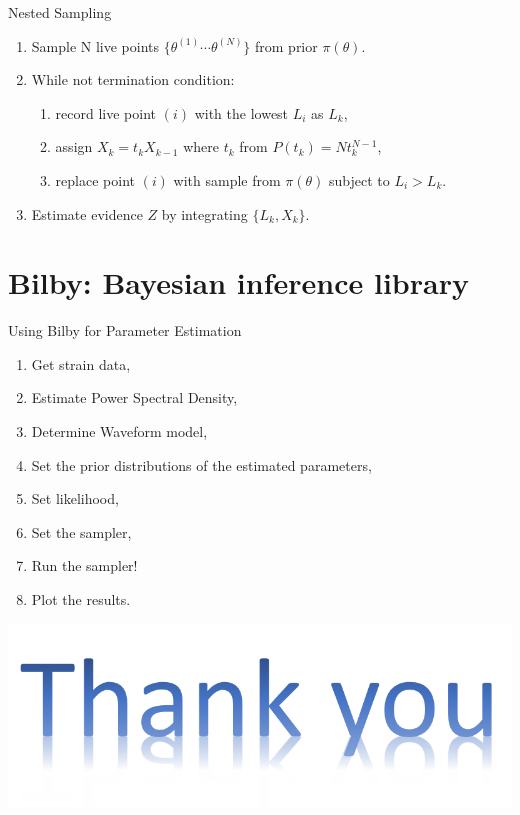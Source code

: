 \documentclass[xcolor=dvipsnames]{beamer}
\begin{document}
\begin{frame}[t]{Nested Sampling}
  \begin{enumerate}
    \item Sample N live points $\{ \theta^{(1)} \cdots \theta^{(N)} \}$ from prior $\pi(\theta)$.
    \item While not termination condition:
      \begin{enumerate}
        \item record live point $(i)$ with the lowest $L_i$ as $L_k$,
        \item assign $X_k = t_k X_{k-1}$ where $t_k$ from $P(t_k) = N t_k^{N-1}$,
        \item replace point $(i)$ with sample from $\pi(\theta)$ subject to $L_i > L_k$.
      \end{enumerate}
    \item Estimate evidence $Z$ by integrating $\{ L_k, X_k \}$.
  \end{enumerate}
\end{frame}

\section[Bilby]{Bilby: Bayesian inference library}

\begin{frame}[c]{Using Bilby for Parameter Estimation}
  \begin{enumerate}
    \item Get strain data,
    \item Estimate Power Spectral Density,
    \item Determine Waveform model,
    \item Set the prior distributions of the estimated parameters,
    \item Set likelihood,
    \item Set the sampler,
    \item Run the sampler!
    \item Plot the results.
  \end{enumerate}
\end{frame}

\begin{frame}[c]{}
  \begin{center}
    \includegraphics[scale=0.5]{image/Thankyou.png}
  \end{center}
\end{frame}
\end{document}
